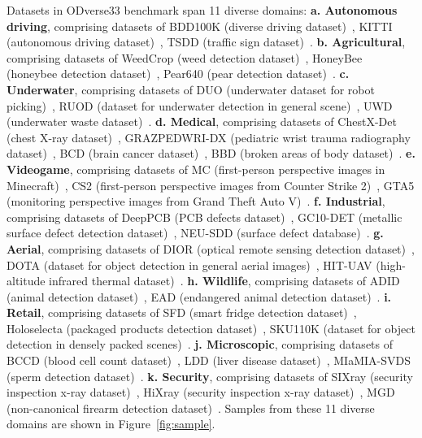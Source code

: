 \documentclass[runningheads]{llncs}
\begin{document}
Datasets in ODverse33 benchmark span 11 diverse domains: 
\textbf{a. Autonomous driving}, comprising datasets of BDD100K (diverse driving dataset)~\cite{Yu2020}, KITTI (autonomous driving dataset)~\cite{Geiger2012}, TSDD (traffic sign dataset)~\cite{SelfDrivingCar2023}. 
\textbf{b. Agricultural}, comprising datasets of WeedCrop (weed detection dataset)~\cite{Sudars2020}, HoneyBee (honeybee detection dataset)~\cite{Nudi2022}, Pear640 (pear detection dataset)~\cite{Kodors2023}. 
\textbf{c. Underwater}, comprising datasets of DUO (underwater dataset for robot picking)~\cite{Liu2021Underwater}, RUOD (dataset for underwater detection in general scene)~\cite{Fu2023}, UWD (underwater waste dataset)~\cite{Waste2024}. 
\textbf{d. Medical}, comprising datasets of ChestX-Det (chest X-ray dataset)~\cite{Liu2020ChestX}, GRAZPEDWRI-DX (pediatric wrist trauma radiography dataset)~\cite{Nagy2022}, BCD (brain cancer dataset)~\cite{YOLO2022}, BBD (broken areas of body dataset)~\cite{TeamKS2023}. 
\textbf{e. Videogame}, comprising datasets of MC (first-person perspective images in Minecraft)~\cite{Minecraft2024}, CS2 (first-person perspective images from Counter Strike 2)~\cite{Gunaydin2024}, GTA5 (monitoring perspective images from Grand Theft Auto V)~\cite{Drone2023}. 
\textbf{f. Industrial}, comprising datasets of DeepPCB (PCB defects dataset)~\cite{Tang2019}, GC10-DET (metallic surface defect detection dataset)~\cite{Lv2020}, NEU-SDD (surface defect database)~\cite{He2020}. 
\textbf{g. Aerial}, comprising datasets of DIOR (optical remote sensing detection dataset)~\cite{Li2020}, DOTA (dataset for object detection in general aerial images)~\cite{Xia2018}, HIT-UAV (high-altitude infrared thermal dataset)~\cite{Suo2023}. 
\textbf{h. Wildlife}, comprising datasets of ADID (animal detection dataset)~\cite{Antoreepjana2023}, EAD (endangered animal detection dataset)~\cite{Endangered2024}. 
\textbf{i. Retail}, comprising datasets of SFD (smart fridge detection dataset)~\cite{Ggong2024}, Holoselecta (packaged products detection dataset)~\cite{Fuchs2019}, SKU110K (dataset for object detection in densely packed scenes)~\cite{Goldman2019}.
\textbf{j. Microscopic}, comprising datasets of BCCD (blood cell count dataset)~\cite{Yao2021}, LDD (liver disease dataset)~\cite{Roboflow1002023}, MIaMIA-SVDS (sperm detection dataset)~\cite{MIaMIA2021}. 
\textbf{k. Security}, comprising datasets of SIXray (security inspection x-ray dataset)~\cite{Miao2019}, HiXray (security inspection x-ray dataset)~\cite{Tao2021}, MGD (non-canonical firearm detection dataset)~\cite{Lim2021}. Samples from these 11 diverse domains are shown in Figure~\ref{fig:sample}.
\end{document}

